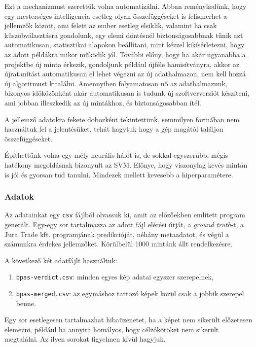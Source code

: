 Ezt a mechanizmust szerettük volna automatizálni. Abban reménykedünk, hogy egy 
mesterséges intelligencia esetleg olyan összefüggéseket is felismerhet a jellemzők
között, ami felett az ember esetleg elsiklik, valamint ha csak küszöbválasztásra
gondolunk, egy elemi döntésnél biztonságosabbnak tűnik azt automatikusan, statisztikai
alapokon beállítani, mint kézzel kikísérletezni, hogy az adott példákra mikor működik jól.
További előny, hogy ha akár ugyanabba a projektbe új minta érkezik, gondoljunk például újféle 
hamisítványra, akkor az újratanítást automatikusan el lehet végezni az új adathalmazon,
nem kell hozzá új algoritmust kitalálni. Amennyiben folyamatosan nő az adathalmazunk, 
bizonyos időközönként akár automatikusan is tudunk új szoftververziót készíteni,
ami jobban illeszkedik az új mintákhoz, és biztonságosabban ítél.


A jellemző adatokra fekete dobozként tekintettünk, semmilyen formában nem használtuk fel
a jelentésüket, tehát hagytuk hogy a gép magától találjon összefüggéseket.


Építhettünk volna egy mély neurális hálót is, de sokkal egyszerűbb, mégis hatékony
megoldásnak bizonyult az SVM.
Előnye, hogy viszonylag kevés mintán is jól és gyorsan tud tanulni.
Mindezek mellett kevesebb a hiperparamétere.


\subsubsection{Adatok}
\label{sec:adatok}

Az adatainkat egy \texttt{csv} fájlból olvassuk ki, amit az előzőekben említett program 
generált. Egy-egy sor tartalmazza az adott fájl elérési útját, a \textit{ground truth}-t,
a Jura Trade kft. programjának predikcióját, néhány metaadatot, és végül a számunkra érdekes jellemzőket.
Körülbelül 1000 mintánk állt rendelkezésre.

\noindent
A következő két adatfájlt használtuk:

\begin{enumerate}
\item
	\texttt{bpas-verdict.csv}: minden egyes kép adatai egyszer szerepelnek,
\item
	\texttt{bpas-merged.csv}: az egymáshoz tartozó képek közül csak a jobbik szerepel benne.
\end{enumerate}

Egy sor esetlegesen tartalmazhat hibaüzenetet, ha a képet nem sikerült előzetesen elemezni, például 
ha annyira homályos, hogy célzóköröket nem sikerült megtalálni. Az ilyen sorokat figyelmen kívül hagyjuk.

